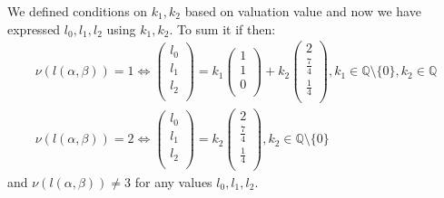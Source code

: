 \documentclass[12pt, a4paper]{article}
\begin{document}
We defined conditions on $k_1,k_2$ based on valuation value and now we have expressed $l_0,l_1,l_2$ using $k_1,k_2$. To sum it if then:
\begin{gather*}
\nu(l(\alpha,\beta)) = 1 \iff \begin{pmatrix}
l_0\\
l_1\\
l_2\\
\end{pmatrix} = k_1\begin{pmatrix}
1\\
1\\
0\\
\end{pmatrix} + k_2\begin{pmatrix}
2\\
\frac{7}{4}\\
\frac{1}{4}\\
\end{pmatrix}, k_1 \in \mathbb{Q}\setminus\{0\}, k_2 \in \mathbb{Q}\\
\nu(l(\alpha,\beta)) = 2 \iff \begin{pmatrix}
l_0\\
l_1\\
l_2\\
\end{pmatrix} = k_2\begin{pmatrix}
2\\
\frac{7}{4}\\
\frac{1}{4}\\
\end{pmatrix}, k_2 \in \mathbb{Q}\setminus\{0\}
\end{gather*}
and $\nu(l(\alpha,\beta)) \neq 3$ for any values $l_0,l_1,l_2$.
\end{document}
